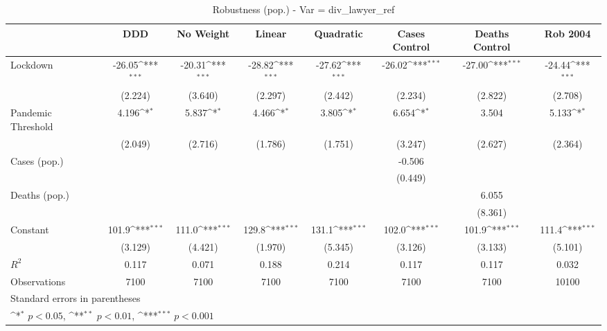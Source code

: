 \documentclass{article}
\begin{document}
{
\def\sym#1{\ifmmode^{#1}\else\(^{#1}\)\fi}
\begin{longtable}{l*{7}{c}}
\caption{Robustness (pop.) - Var = div\_lawyer\_ref}\\
\hline\hline\endfirsthead\hline\endhead\hline\endfoot\endlastfoot
                &\multicolumn{1}{c}{DDD}&\multicolumn{1}{c}{No Weight}&\multicolumn{1}{c}{Linear}&\multicolumn{1}{c}{Quadratic}&\multicolumn{1}{c}{Cases Control}&\multicolumn{1}{c}{Deaths Control}&\multicolumn{1}{c}{Rob 2004}\\
\hline
Lockdown        &   -26.05\sym{***}&   -20.31\sym{***}&   -28.82\sym{***}&   -27.62\sym{***}&   -26.02\sym{***}&   -27.00\sym{***}&   -24.44\sym{***}\\
                &  (2.224)         &  (3.640)         &  (2.297)         &  (2.442)         &  (2.234)         &  (2.822)         &  (2.708)         \\
Pandemic Threshold&    4.196\sym{*}  &    5.837\sym{*}  &    4.466\sym{*}  &    3.805\sym{*}  &    6.654\sym{*}  &    3.504         &    5.133\sym{*}  \\
                &  (2.049)         &  (2.716)         &  (1.786)         &  (1.751)         &  (3.247)         &  (2.627)         &  (2.364)         \\
Cases (pop.)    &                  &                  &                  &                  &   -0.506         &                  &                  \\
                &                  &                  &                  &                  &  (0.449)         &                  &                  \\
Deaths (pop.)   &                  &                  &                  &                  &                  &    6.055         &                  \\
                &                  &                  &                  &                  &                  &  (8.361)         &                  \\
Constant        &    101.9\sym{***}&    111.0\sym{***}&    129.8\sym{***}&    131.1\sym{***}&    102.0\sym{***}&    101.9\sym{***}&    111.4\sym{***}\\
                &  (3.129)         &  (4.421)         &  (1.970)         &  (5.345)         &  (3.126)         &  (3.133)         &  (5.101)         \\
\hline
\(R^{2}\)       &    0.117         &    0.071         &    0.188         &    0.214         &    0.117         &    0.117         &    0.032         \\
Observations    &     7100         &     7100         &     7100         &     7100         &     7100         &     7100         &    10100         \\
\hline\hline
\multicolumn{8}{l}{\footnotesize Standard errors in parentheses}\\
\multicolumn{8}{l}{\footnotesize \sym{*} \(p<0.05\), \sym{**} \(p<0.01\), \sym{***} \(p<0.001\)}\\
\end{longtable}
}
\end{document}
